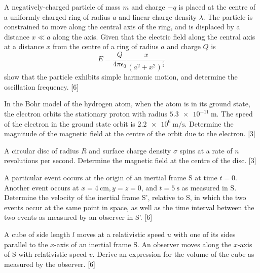 \begin{problem}
    \begin{subproblem}
        A negatively-charged particle of mass $m$ and charge $-q$ is placed at the centre of a uniformly charged ring of radius $a$ and linear charge density $\lambda$. The particle is constrained to move along the central axis of the ring, and is displaced by a distance $x\ll a$ along the axis. Given that the electric field along the central axis at a distance $x$ from the centre of a ring of radius $a$ and charge $Q$ is
        \[E=\frac{Q}{4 \pi \epsilon_{0}} \frac{x}{\left(a^{2}+x^{2}\right)^{\frac{3}{2}}}\]
        show that the particle exhibits simple harmonic motion, and determine the oscillation frequency.
    \hfill{[6]}\end{subproblem}
    \begin{subproblem}
        In the Bohr model of the hydrogen atom, when the atom is in its ground state, the electron orbits the stationary proton with radius $\qty{5.3e-11}{\m}$. The speed of the electron in the ground state orbit is $\qty{2.2e6}{\m\per\s}$. Determine the magnitude of the magnetic field at the centre of the orbit due to the electron.
    \hfill{[3]}\end{subproblem}
    \begin{subproblem}
        A circular disc of radius $R$ and surface charge density $\sigma$ spins at a rate of $n$ revolutions per second. Determine the magnetic field at the centre of the disc.
    \hfill{[3]}\end{subproblem}
\end{problem}

\begin{problem}
    \begin{subproblem}
        A particular event occurs at the origin of an inertial frame S at time $t=0$. Another event occurs at $x=\qty{4}{\cm}, y=z=0$, and $t=\qty{5}{\s}$ as measured in $\mathrm{S} .$ Determine the velocity of the inertial frame S', relative to S, in which the two events occur at the same point in space, as well as the time interval between the two events as measured by an observer in S'.
    \hfill{[6]}\end{subproblem}
    \begin{subproblem}
        A cube of side length $l$ moves at a relativistic speed $u$ with one of its sides parallel to the $x$-axis of an inertial frame S. An observer moves along the $x$-axis of S with relativistic speed $v$. Derive an expression for the volume of the cube as measured by the observer.
    \hfill{[6]}\end{subproblem}
\end{problem}

